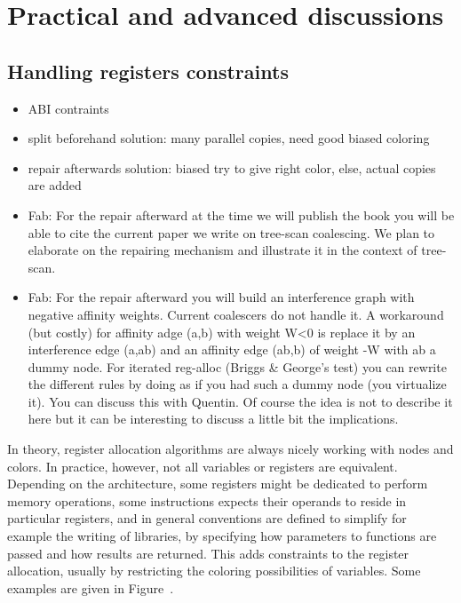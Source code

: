 {\section{Practical and advanced discussions}
\label{sec:practical-regalloc}


\subsection{Handling registers constraints}
{\sl
\begin{itemize}
  \item ABI contraints
  \item split beforehand solution: many parallel copies, need good biased 
    coloring
  \item repair afterwards solution: biased try to give right color, else, 
    actual copies are added
  \item Fab: For the repair afterward at the time we will publish the book you 
    will be able to cite the current paper we write on tree-scan coalescing. We 
    plan to elaborate on the repairing mechanism and illustrate it in the 
    context of tree-scan.
  \item Fab: For the repair afterward you will build an interference graph with 
    negative affinity weights. Current coalescers do not handle it. A 
    workaround (but costly) for affinity adge (a,b) with weight W<0 is replace 
    it by an interference edge (a,ab) and an affinity edge (ab,b) of weight -W 
    with ab a dummy node. For iterated reg-alloc (Briggs \& George's test) you 
    can rewrite the different rules by doing as if you had such a dummy node 
    (you virtualize it). You can discuss this with Quentin. Of course the idea 
    is not to describe it here but it can be interesting to discuss a little 
    bit the implications.
\end{itemize}
}

In theory, register allocation algorithms are always nicely working with nodes 
and colors. In practice, however, not all variables or registers are 
equivalent. Depending on the architecture, some registers might be dedicated 
to perform memory operations, some instructions expects their operands to 
reside in particular registers, and in general conventions are defined to 
simplify for example the writing of libraries, by specifying how parameters to 
functions are passed and how results are returned. This adds constraints to the 
register allocation, usually by restricting the coloring possibilities of 
variables. Some examples are given in Figure~\label{fig:reg-constraints}.

}
